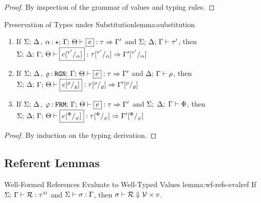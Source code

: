 \begin{proof}
  By inspection of the grammar of values and typing rules.
\end{proof}

\begin{oxlemma}{Preservation of Types under Substitution}{lemma:substitution}
  \hfill
  \begin{enumerate}
  \item If $\oxtypjudge{\oxglobalctx}{ \oxextendctx{\oxtvarctx}{
        \oxtvarctxentry{\oxtvar}{\oxktype} }
    }{\oxkontctx}{\oxvarctx}{\oxexpr}{\oxtype}{\oxvarctx^\prime}$ and
    $\Sigma; \, \Delta; \, \Gamma \vdash \tau^\prime$, then
    $\oxtypjudge{\oxglobalctx}{\oxtvarctx}{\oxkontctx}{\oxvarctx}{
      \oxsubst{\oxexpr}{\oxtype^\prime}{\oxtvar}
    }{\oxsubst{\oxtype}{\oxtype^\prime}{\oxtvar}}
    {\oxsubst{\oxvarctx^\prime}{\oxtype^\prime}{\oxtvar}}$
  \item If $\oxtypjudge{\oxglobalctx}{ \oxextendctx{\oxtvarctx}{
        \oxtvarctxentry{\oxabsprov}{\oxkprov} }
    }{\oxkontctx}{\oxvarctx}{\oxexpr}{\oxtype}{\oxvarctx^\prime}$ and
    $\Delta; \, \Gamma \vdash \rho$, then
    $\oxtypjudge{\oxglobalctx}{\oxtvarctx}{\oxkontctx} {\oxvarctx}{
      \oxsubst{\oxexpr}{\oxprov}{\oxabsprov}
    }{\oxsubst{\oxtype}{\oxprov}{\oxabsprov}}
    {\oxsubst{\oxvarctx^\prime}{\oxprov}{\oxabsprov}}$
  \item If $\oxtypjudge{\oxglobalctx}{ \oxextendctx{\oxtvarctx}{
        \oxtvarctxentry{\oxenvvar}{\oxkenv} }
    }{\oxkontctx}{\oxvarctx}{\oxexpr}{\oxtype}{\oxvarctx^\prime}$ and
    $\Sigma; \; \Delta; \; \Gamma \vdash \Phi$, then
    $\oxtypjudge{\oxglobalctx}{\oxtvarctx}{\oxkontctx} {\oxvarctx}{
      \oxsubst{\oxexpr}{\oxenv}{\oxenvvar}
    }{\oxsubst{\oxtype}{\oxenv}{\oxenvvar}}
    {\oxsubst{\oxvarctx^\prime}{\oxenv}{\oxenvvar}}$
  \end{enumerate}
\end{oxlemma}

\begin{proof}
  By induction on the typing derivation.
\end{proof}

\subsection{Referent Lemmas}
\label{sec:ref-lemmas}

\begin{oxlemma}{Well-Formed References Evaluate to Well-Typed Values}
  {lemma:wf-refs-evalref}
  If $\Sigma; \, \Gamma \vdash \mathcal{R} : \tau^\textsc{xi}$ and
  $\Sigma \vdash \sigma : \Gamma$, then
  $\sigma \vdash \mathcal{R} \Downarrow \mathcal{V} \times v$.
\end{oxlemma}

